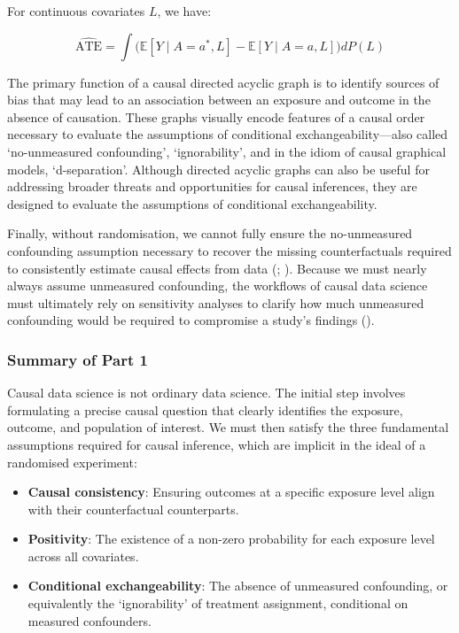 \documentclass[
  single column]{article}
\providecommand{\tightlist}{%
  \setlength{\itemsep}{0pt}\setlength{\parskip}{0pt}}\usepackage{longtable,booktabs,array}
\begin{document}
For continuous covariates \(L\), we have:

\[
\widehat{\text{ATE}} = \int \big( \mathbb{E}[Y \mid A = a^*, L] - \mathbb{E}[Y \mid A = a, L] \big) dP(L)
\]

The primary function of a causal directed acyclic graph is to identify
sources of bias that may lead to an association between an exposure and
outcome in the absence of causation. These graphs visually encode
features of a causal order necessary to evaluate the assumptions of
conditional exchangeability---also called `no-unmeasured confounding',
`ignorability', and in the idiom of causal graphical models,
`d-separation'. Although directed acyclic graphs can also be useful for
addressing broader threats and opportunities for causal inferences, they
are designed to evaluate the assumptions of conditional exchangeability.

Finally, without randomisation, we cannot fully ensure the no-unmeasured
confounding assumption necessary to recover the missing counterfactuals
required to consistently estimate causal effects from data
(;
). Because we must
nearly always assume unmeasured confounding, the workflows of causal
data science must ultimately rely on sensitivity analyses to clarify how
much unmeasured confounding would be required to compromise a study's
findings ().

\subsubsection{Summary of Part 1}\label{summary-of-part-1}

Causal data science is not ordinary data science. The initial step
involves formulating a precise causal question that clearly identifies
the exposure, outcome, and population of interest. We must then satisfy
the three fundamental assumptions required for causal inference, which
are implicit in the ideal of a randomised experiment:

\begin{itemize}
\tightlist
\item
  \textbf{Causal consistency}: Ensuring outcomes at a specific exposure
  level align with their counterfactual counterparts.
\item
  \textbf{Positivity}: The existence of a non-zero probability for each
  exposure level across all covariates.
\item
  \textbf{Conditional exchangeability}: The absence of unmeasured
  confounding, or equivalently the `ignorability' of treatment
  assignment, conditional on measured confounders.
\end{itemize}
\end{document}
